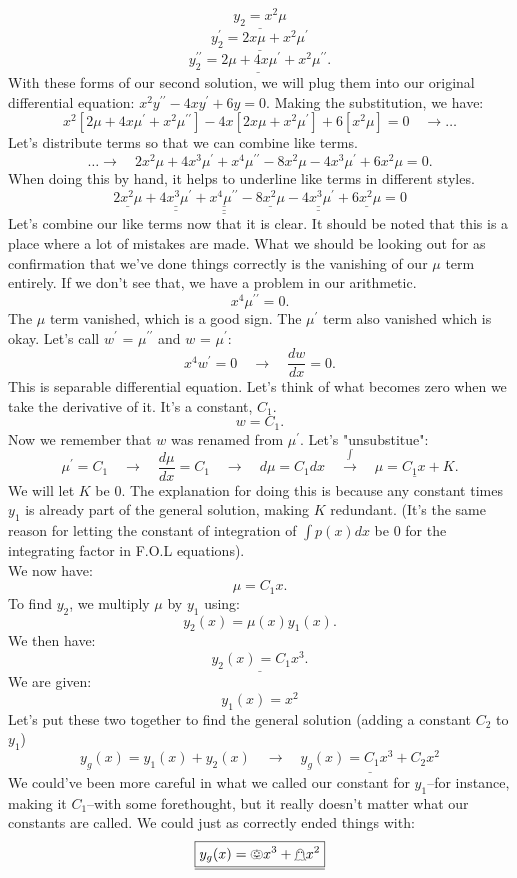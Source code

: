 \documentclass[a4paper,12pt]{article}
\begin{document}
 $$ \underline{y_2 = x^2\mu} $$
 $$ \underline{y^{\prime}_2 = 2x\mu + x^2\mu^{\prime} }  $$
 $$ \underline{y^{\prime \prime}_2 = 2\mu + 4x\mu^{\prime} + x^2\mu^{\prime \prime}}. $$
 With these forms of our second solution, we will plug them into our original differential equation: $x^2 y^{\prime \prime}-4 x y^{\prime}+6 y=0$.
 Making the substitution, we have:
 $$ x^2[2\mu + 4x\mu^{\prime} + x^2\mu^{\prime \prime}] -4x[2x\mu + x^2\mu^{\prime}] + 6[x^2\mu] = 0 \quad\rightarrow \ldots$$
 Let's distribute terms so that we can combine like terms.
 $$\ldots\rightarrow \quad 2x^2\mu + 4x^3\mu^{\prime} + x^4\mu^{\prime \prime} - 8x^2\mu - 4x^3\mu^{\prime} + 6x^2\mu = 0. $$
 When doing this by hand, it helps to underline like terms in different styles.
 $$ \underline{2x^2\mu} + \underline{\underline{4x^3\mu^{\prime}}} + \underline{\underline{\underline{x^4\mu^{\prime \prime}}}} - \underline{8x^2\mu} - \underline{\underline{4x^3\mu^{\prime}}} + \underline{6x^2\mu} = 0 $$
 Let's combine our like terms now that it is clear. It should be noted that this is a place where a lot of mistakes are made. What we should be looking out for as confirmation that we've done things correctly is the vanishing of our $\mu$ term entirely. If we don't see that, we have a problem in our arithmetic.
 $$ x^4\mu^{\prime \prime} = 0 .$$
 The $\mu$ term vanished, which is a good sign. The $\mu^{\prime}$ term also vanished which is okay. Let's call $w^{\prime}$ = $\mu^{\prime \prime}$ and $w$ = $\mu^{\prime}$:
 $$ x^4w^{\prime} = 0 \quad\rightarrow \quad \frac{dw	}{dx} = 0.$$
 This is separable differential equation. Let's think of what becomes zero when we take the derivative of it. It's a constant, $C_1$.
 $$  w = C_1.$$
 Now we remember that $w$ was renamed from $\mu^{\prime}$. Let's "unsubstitue":
 $$ \mu^\prime = C_1 \quad\rightarrow \quad \frac{d\mu}{dx} = C_1 \quad\rightarrow \quad d\mu = C_1dx \quad\overset{\int}\rightarrow \quad \underline{\mu = C_1x + K}. $$
 We will let $K$ be 0. The explanation for doing this is because any constant times $y_1$ is already part of the general solution, making $K$ redundant. (It's the same reason for letting the constant of integration of $\int p(x)dx$ be 0 for the integrating factor in F.O.L equations).\\
 
 We now have:
 $$ \mu = C_1x. $$
 To find $y_2$, we multiply $\mu$ by $y_1$ using:
 $$ y_2(x) = \mu(x)y_1(x). $$
 We then have:
 $$ \underline{y_2(x) = C_1x^3.} $$
 We are given:
 $$ y_1(x) = x^2 $$
 Let's put these two together to find the general solution (adding a constant $C_2$ to $y_1$)
 $$ y_g(x) = y_1(x) + y_2(x) \quad\rightarrow \quad \underline{\boxed{y_g(x) = C_1x^3 + C_2x^2}} $$
 We could've been more careful in what we called our constant for $y_1$--for instance, making it $C_1$--with some forethought, but it really doesn't matter what our constants are called. We could just as correctly ended things with:
 $$ \underline{\boxed{y_g(x) = \pumpkin x^3 + \mathghost x^2}} $$
\end{document}
